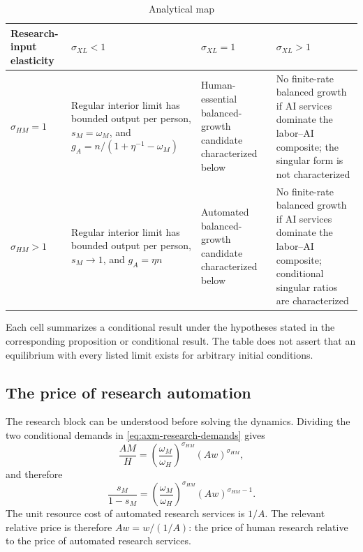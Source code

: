 \begin{table}[H]
\centering
\small
\setlength{\tabcolsep}{4pt}
\caption{Analytical map}
\label{tab:axm-regime-map}
\begin{tabular}{P{0.14\textwidth}P{0.235\textwidth}P{0.235\textwidth}P{0.235\textwidth}}
\toprule
Research-input elasticity & \(\sigma_{XL}<1\) & \(\sigma_{XL}=1\) & \(\sigma_{XL}>1\)\\
\midrule
\(\sigma_{HM}=1\) &
Regular interior limit has bounded output per person,
\(s_M=\omega_M\), and
\(g_A=n/(1+\eta^{-1}-\omega_M)\) &
Human-essential balanced-growth candidate characterized below &
 No finite-rate balanced growth if AI services dominate the labor--AI composite; the singular form is not characterized\\
\(\sigma_{HM}>1\) &
 Regular interior limit has bounded output per person,
 \(s_M\to1\), and \(g_A=\eta n\) &
 Automated balanced-growth candidate characterized below &
 No finite-rate balanced growth if AI services dominate the labor--AI composite; conditional singular ratios are characterized\\
\bottomrule
\end{tabular}
\end{table}

Each cell summarizes a conditional result under the hypotheses stated in the
corresponding proposition or conditional result. The table does not assert that
an equilibrium with every listed limit exists for arbitrary initial conditions.

\subsection{The price of research automation}

The research block can be understood before solving the dynamics. Dividing the
two conditional demands in \eqref{eq:axm-research-demands} gives
\begin{equation}
 \frac{AM}{H}
 =\left(\frac{\omega_M}{\omega_H}\right)^{\sigma_{HM}}
  (Aw)^{\sigma_{HM}},
 \label{eq:axm-input-ratio}
\end{equation}
and therefore
\begin{equation}
 \frac{s_M}{1-s_M}
 =\left(\frac{\omega_M}{\omega_H}\right)^{\sigma_{HM}}
  (Aw)^{\sigma_{HM}-1}.
 \label{eq:axm-automation-odds}
\end{equation}
The unit resource cost of automated research services is \(1/A\). The relevant
relative price is therefore \(Aw=w/(1/A)\): the price of human research relative
to the price of automated research services.

